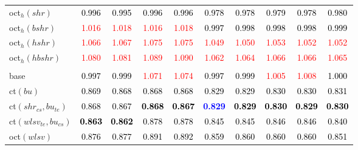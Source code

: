 \begin{tabular}[t]{l|ccccccccc}
oct$_h(shr)$ & \textcolor{black}{0.996} & \textcolor{black}{0.995} & \textcolor{black}{0.996} & \textcolor{black}{0.996} & \textcolor{black}{0.978} & \textcolor{black}{0.978} & \textcolor{black}{0.979} & \textcolor{black}{0.978} & \textcolor{black}{0.980}\\
oct$_h(bshr)$ & \textcolor{red}{1.016} & \textcolor{red}{1.018} & \textcolor{red}{1.016} & \textcolor{red}{1.018} & \textcolor{black}{0.997} & \textcolor{black}{0.998} & \textcolor{black}{0.998} & \textcolor{black}{0.998} & \textcolor{black}{0.999}\\
oct$_h(hshr)$ & \textcolor{red}{1.066} & \textcolor{red}{1.067} & \textcolor{red}{1.075} & \textcolor{red}{1.075} & \textcolor{red}{1.049} & \textcolor{red}{1.050} & \textcolor{red}{1.053} & \textcolor{red}{1.052} & \textcolor{red}{1.052}\\
oct$_h(hbshr)$ & \textcolor{red}{1.080} & \textcolor{red}{1.081} & \textcolor{red}{1.089} & \textcolor{red}{1.090} & \textcolor{red}{1.062} & \textcolor{red}{1.064} & \textcolor{red}{1.066} & \textcolor{red}{1.066} & \textcolor{red}{1.065}\\
\addlinespace[0.3em]
\multicolumn{10}{c}{\textbf{$k = 2$}}\\
base & \textcolor{black}{0.997} & \textcolor{black}{0.999} & \textcolor{red}{1.071} & \textcolor{red}{1.074} & \textcolor{black}{0.997} & \textcolor{black}{0.999} & \textcolor{red}{1.005} & \textcolor{red}{1.008} & \textcolor{black}{1.000}\\
ct$(bu)$ & \textcolor{black}{0.869} & \textcolor{black}{0.868} & \textcolor{black}{0.868} & \textcolor{black}{0.868} & \textcolor{black}{0.829} & \textcolor{black}{0.829} & \textcolor{black}{0.830} & \textcolor{black}{0.830} & \textcolor{black}{0.831}\\
ct$(shr_{cs}, bu_{te})$ & \textcolor{black}{0.868} & \textcolor{black}{0.867} & \textcolor{black}{\textbf{0.868}} & \textcolor{black}{\textbf{0.867}} & \textcolor{blue}{\textbf{0.829}} & \textcolor{black}{\textbf{0.829}} & \textcolor{black}{\textbf{0.830}} & \textcolor{black}{\textbf{0.829}} & \textcolor{black}{\textbf{0.830}}\\
ct$(wlsv_{te}, bu_{cs})$ & \textcolor{black}{\textbf{0.863}} & \textcolor{black}{\textbf{0.862}} & \textcolor{black}{0.878} & \textcolor{black}{0.878} & \textcolor{black}{0.845} & \textcolor{black}{0.845} & \textcolor{black}{0.846} & \textcolor{black}{0.846} & \textcolor{black}{0.840}\\
oct$(wlsv)$ & \textcolor{black}{0.876} & \textcolor{black}{0.877} & \textcolor{black}{0.891} & \textcolor{black}{0.892} & \textcolor{black}{0.859} & \textcolor{black}{0.860} & \textcolor{black}{0.860} & \textcolor{black}{0.860} & \textcolor{black}{0.851}\\

\end{tabular}
